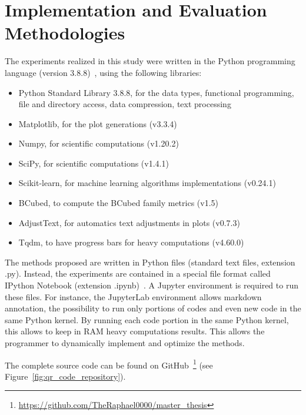 \section{Implementation and Evaluation Methodologies}

The experiments realized in this study were written in the Python programming language (version 3.8.8)~\cite{python}, using the following libraries:

\begin{itemize}
  \item Python Standard Library 3.8.8, for the data types, functional programming, file and directory access, data compression, text processing \cite{python_standard_library}
  \item Matplotlib, for the plot generations (v3.3.4) \cite{matplotlib}
  \item Numpy, for scientific computations (v1.20.2) \cite{numpy}
  \item SciPy, for scientific computations (v1.4.1) \cite{scipy}
  \item Scikit-learn, for machine learning algorithms implementations (v0.24.1) \cite{sklearn}
  \item BCubed, to compute the BCubed family metrics (v1.5) \cite{bcubed_gh}
  \item AdjustText, for automatics text adjustments in plots (v0.7.3) \cite{adjustText}
  \item Tqdm, to have progress bars for heavy computations (v4.60.0) \cite{tqdm}
\end{itemize}

The methods proposed are written in Python files (standard text files, extension .py).
Instead, the experiments are contained in a special file format called IPython Notebook (extension .ipynb)~\cite{jupyter}.
A Jupyter environment is required to run these files.
For instance, the JupyterLab environment allows markdown annotation, the possibility to run only portions of codes and even new code in the same Python kernel.
By running each code portion in the same Python kernel, this allows to keep in RAM heavy computations results.
This allows the programmer to dynamically implement and optimize the methods.

The complete source code can be found on GitHub~\footnote{\url{https://github.com/TheRaphael0000/master_thesis}} (see Figure~\ref{fig:qr_code_repository}).

